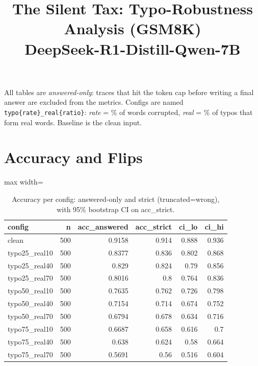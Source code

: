 \documentclass[11pt]{article}
\title{The Silent Tax: Typo-Robustness Analysis (GSM8K)\\\large DeepSeek-R1-Distill-Qwen-7B}
\date{}
\begin{document}
\maketitle
\noindent All tables are \emph{answered-only}: traces that hit the token cap before writing a final answer are excluded from the metrics. Configs are named \texttt{typo\{rate\}\_real\{ratio\}}: \emph{rate} = \% of words corrupted, \emph{real} = \% of typos that form real words. Baseline is the clean input.

\section*{Accuracy and Flips}
\begin{table}[H]
\centering
\caption{Accuracy per config: answered-only and strict (truncated=wrong), with 95\% bootstrap CI on acc\_strict.}
\small
\begin{adjustbox}{max width=\textwidth}
\begin{tabular}{lrrrrr}
\toprule
\textbf{config} & \textbf{n} & \textbf{acc\_answered} & \textbf{acc\_strict} & \textbf{ci\_lo} & \textbf{ci\_hi} \\
\midrule
clean & 500 & 0.9158 & 0.914 & 0.888 & 0.936 \\
typo25\_real10 & 500 & 0.8377 & 0.836 & 0.802 & 0.868 \\
typo25\_real40 & 500 & 0.829 & 0.824 & 0.79 & 0.856 \\
typo25\_real70 & 500 & 0.8016 & 0.8 & 0.764 & 0.836 \\
typo50\_real10 & 500 & 0.7635 & 0.762 & 0.726 & 0.798 \\
typo50\_real40 & 500 & 0.7154 & 0.714 & 0.674 & 0.752 \\
typo50\_real70 & 500 & 0.6794 & 0.678 & 0.634 & 0.716 \\
typo75\_real10 & 500 & 0.6687 & 0.658 & 0.616 & 0.7 \\
typo75\_real40 & 500 & 0.638 & 0.624 & 0.58 & 0.664 \\
typo75\_real70 & 500 & 0.5691 & 0.56 & 0.516 & 0.604 \\
\bottomrule
\end{tabular}
\end{adjustbox}
\end{table}
\end{document}
